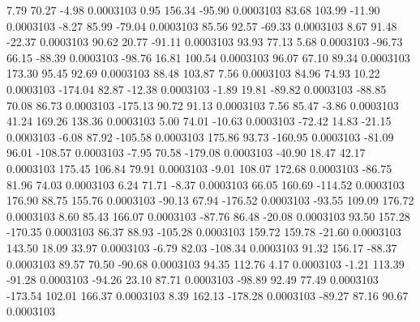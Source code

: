         7.79       70.27       -4.98     0.0003103
        0.95      156.34      -95.90     0.0003103
       83.68      103.99      -11.90     0.0003103
       -8.27       85.99      -79.04     0.0003103
       85.56       92.57      -69.33     0.0003103
        8.67       91.48      -22.37     0.0003103
       90.62       20.77      -91.11     0.0003103
       93.93       77.13        5.68     0.0003103
      -96.73       66.15      -88.39     0.0003103
      -98.76       16.81      100.54     0.0003103
       96.07       67.10       89.34     0.0003103
      173.30       95.45       92.69     0.0003103
       88.48      103.87        7.56     0.0003103
       84.96       74.93       10.22     0.0003103
     -174.04       82.87      -12.38     0.0003103
       -1.89       19.81      -89.82     0.0003103
      -88.85       70.08       86.73     0.0003103
     -175.13       90.72       91.13     0.0003103
        7.56       85.47       -3.86     0.0003103
       41.24      169.26      138.36     0.0003103
        5.00       74.01      -10.63     0.0003103
      -72.42       14.83      -21.15     0.0003103
       -6.08       87.92     -105.58     0.0003103
      175.86       93.73     -160.95     0.0003103
      -81.09       96.01     -108.57     0.0003103
       -7.95       70.58     -179.08     0.0003103
      -40.90       18.47       42.17     0.0003103
      175.45      106.84       79.91     0.0003103
       -9.01      108.07      172.68     0.0003103
      -86.75       81.96       74.03     0.0003103
        6.24       71.71       -8.37     0.0003103
       66.05      160.69     -114.52     0.0003103
      176.90       88.75      155.76     0.0003103
      -90.13       67.94     -176.52     0.0003103
      -93.55      109.09      176.72     0.0003103
        8.60       85.43      166.07     0.0003103
      -87.76       86.48      -20.08     0.0003103
       93.50      157.28     -170.35     0.0003103
       86.37       88.93     -105.28     0.0003103
      159.72      159.78      -21.60     0.0003103
      143.50       18.09       33.97     0.0003103
       -6.79       82.03     -108.34     0.0003103
       91.32      156.17      -88.37     0.0003103
       89.57       70.50      -90.68     0.0003103
       94.35      112.76        4.17     0.0003103
       -1.21      113.39      -91.28     0.0003103
      -94.26       23.10       87.71     0.0003103
      -98.89       92.49       77.49     0.0003103
     -173.54      102.01      166.37     0.0003103
        8.39      162.13     -178.28     0.0003103
      -89.27       87.16       90.67     0.0003103
